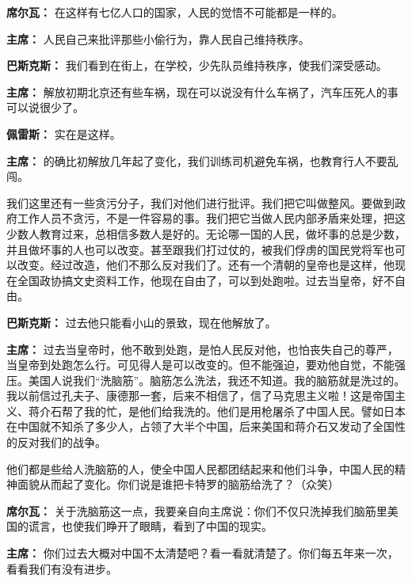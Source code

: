 \begin{list}{}
\item[\textbf{席尔瓦：}]在这样有七亿人口的国家，人民的觉悟不可能都是一样的。

\item[\textbf{主席：}] 人民自己来批评那些小偷行为，靠人民自己维持秩序。

\item[\textbf{巴斯克斯：}] 我们看到在街上，在学校，少先队员维持秩序，使我们深受感动。

\item[\textbf{主席：}] 解放初期北京还有些车祸，现在可以说没有什么车祸了，汽车压死人的事可以说很少了。

\item[\textbf{佩雷斯：}] 实在是这样。

\item[\textbf{主席：}] 的确比初解放几年起了变化，我们训练司机避免车祸，也教育行人不要乱闯。

我们这里还有一些贪污分子，我们对他们进行批评。我们把它叫做整风。要做到政府工作人员不贪污，不是一件容易的事。我们把它当做人民内部矛盾来处理，把这少数人教育过来，总相信多数人是好的。无论哪一国的人民，做坏事的总是少数，并且做坏事的人也可以改变。甚至跟我们打过仗的，被我们俘虏的国民党将军也可以改变。经过改造，他们不那么反对我们了。还有一个清朝的皇帝也是这样，他现在全国政协搞文史资料工作，他现在自由了，可以到处跑啦。过去当皇帝，好不自由。

\item[\textbf{巴斯克斯：}] 过去他只能看小山的景致，现在他解放了。

\item[\textbf{主席：}] 过去当皇帝时，他不敢到处跑，是怕人民反对他，也怕丧失自己的尊严，当皇帝到处跑怎么行。可见得人是可以改变的。但不能强迫，要劝他自觉，不能强压。美国人说我们“洗脑筋”。脑筋怎么洗法，我还不知道。我的脑筋就是洗过的。我以前信过孔夫子、康德那一套，后来不相信了，信了马克思主义啦！这是帝国主义、蒋介石帮了我的忙，是他们给我洗的。他们是用枪屠杀了中国人民。譬如日本在中国就不知杀了多少人，占领了大半个中国，后来美国和蒋介石又发动了全国性的反对我们的战争。

他们都是些给人洗脑筋的人，使全中国人民都团结起来和他们斗争，中国人民的精神面貌从而起了变化。你们说是谁把卡特罗的脑筋给洗了？（众笑）

\item[\textbf{席尔瓦：}] 关于洗脑筋这一点，我要亲自向主席说：你们不仅只洗掉我们脑筋里美国的谎言，也使我们睁开了眼睛，看到了中国的现实。

\item[\textbf{主席：}] 你们过去大概对中国不太清楚吧？看一看就清楚了。你们每五年来一次，看看我们有没有进步。


\end{list}

